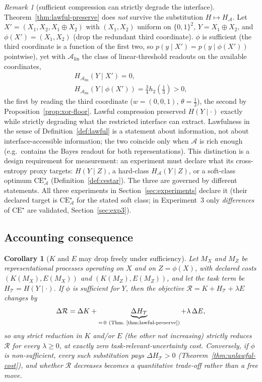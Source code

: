 \documentclass[twocolumn,10pt]{article}
\newtheorem{corollary}[theorem]{Corollary}
\theoremstyle{definition}
\theoremstyle{remark}
\newtheorem{remark}[theorem]{Remark}
\newcommand{\cA}{\mathcal{A}}
\newcommand{\cT}{\mathcal{T}}
\newcommand{\cR}{\mathcal{R}}
\newcommand{\Alin}{\cA_{\mathrm{lin}}}
\newcommand{\hb}{h_2}
\newcommand{\lamvar}{\lambda}
\newcommand{\CE}{\mathrm{CE}}
\begin{document}
\begin{remark}[sufficient compression can strictly degrade the interface]
\label{rem:sufficient-hurts}
Theorem~\ref{thm:lawful-preserve} does \emph{not} survive the substitution
$H \mapsto H_{\cA}$. Let $X' = (X_1, X_2, X_1 \oplus X_2)$ with
$(X_1, X_2)$ uniform on $\{0,1\}^2$, $Y = X_1 \oplus X_2$, and
$\phi(X') = (X_1, X_2)$ (drop the redundant third coordinate). $\phi$ is
sufficient (the third coordinate is a function of the first two, so
$p(y \mid X') = p(y \mid \phi(X'))$ pointwise), yet with $\Alin$ the
class of linear-threshold readouts on the available coordinates,
\begin{gather*}
H_{\Alin}(Y \mid X') = 0,
\\
H_{\Alin}(Y \mid \phi(X')) = \tfrac34 \hb(\tfrac13) > 0,
\end{gather*}
the first by reading the third coordinate ($w = (0,0,1)$,
$\theta = \tfrac12$), the second by Proposition~\ref{prop:xor-floor}. Lawful compression preserved
$H(Y \mid \cdot)$ exactly while strictly degrading what the restricted
interface can extract. Lawfulness in the sense of
Definition~\ref{def:lawful} is a statement about information, not about
interface-accessible information; the two coincide only when $\cA$ is rich
enough (e.g.\ contains the Bayes readout for both representations). This
distinction is a design requirement for measurement: an experiment must
declare what its cross-entropy proxy targets: $H(Y \mid Z)$, a
hard-class $H_{\cA}(Y \mid Z)$, or a soft-class optimum
$\CE^{\star}_{\cA}$ (Definition~\ref{def:cestar}). The three
are governed by different statements.
All three experiments in Section~\ref{sec:experiments} declare it
(their declared target is $\CE^{\star}_{\cA}$ for the stated soft
class; in Experiment~3 only \emph{differences} of $\CE^{\star}$ are
validated, Section~\ref{sec:exp3}).
\end{remark}

\subsection{Accounting consequence}

\begin{corollary}[$K$ and $E$ may drop freely under sufficiency]
\label{cor:accounting}
Let $M_X$ and $M_Z$ be representational processes operating on $X$ and on
$Z = \phi(X)$, with declared costs $(K(M_X), E(M_X))$ and
$(K(M_Z), E(M_Z))$, and let the task term be $H_\cT = H(Y \mid \cdot)$. If
$\phi$ is sufficient for $Y$, then the objective
$\cR = K + H_\cT + \lamvar E$ changes by
\[
\Delta\cR = \Delta K + \underbrace{\Delta H_\cT}_{=\,0
\ (\text{Thm.~\ref{thm:lawful-preserve}})} + \lamvar\, \Delta E,
\]
so any strict reduction in $K$ and/or $E$ (the other not increasing)
strictly reduces $\cR$ \emph{for every} $\lamvar \ge 0$, at exactly zero
task-relevant-uncertainty cost. Conversely, if $\phi$ is non-sufficient,
every such substitution pays $\Delta H_\cT > 0$
(Theorem~\ref{thm:unlawful-cost}), and whether $\cR$ decreases becomes a
quantitative trade-off rather than a free move.
\end{corollary}
\end{document}
